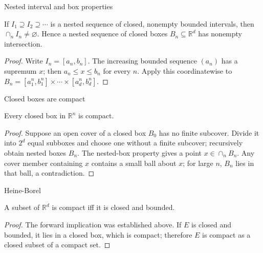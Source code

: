 \begin{theorem}{Nested interval and box properties}

If \(I_{1} \supseteq I_{2} \supseteq \cdots\) is a nested sequence of closed, nonempty bounded intervals, then \(\cap_{n}I_{n} \neq \varnothing\). Hence a nested sequence of closed boxes \(B_{n} \subseteq \mathbb{R}^{d}\) has nonempty intersection.

\end{theorem}

\begin{proof}

Write \(I_{n} = \left\lbrack {a_{n},b_{n}} \right\rbrack\). The increasing bounded sequence \(\left( a_{n} \right)\) has a supremum \(x\); then \(a_{n} \leq x \leq b_{n}\) for every \(n\). Apply this coordinatewise to \(B_{n} = \left\lbrack {a_{1}^{n},b_{1}^{n}} \right\rbrack \times \cdots \times \left\lbrack {a_{d}^{n},b_{d}^{n}} \right\rbrack\).

\end{proof}

\begin{theorem}{Closed boxes are compact}

Every closed box in \(\mathbb{R}^{n}\) is compact.

\end{theorem}

\begin{proof}

Suppose an open cover of a closed box \(B_{0}\) has no finite subcover. Divide it into \(2^{d}\) equal subboxes and choose one without a finite subcover; recursively obtain nested boxes \(B_{n}\). The nested-box property gives a point \(x \in \cap_{n}B_{n}\). Any cover member containing \(x\) contains a small ball about \(x\); for large \(n\), \(B_{n}\) lies in that ball, a contradiction.

\end{proof}

\begin{theorem}{Heine-Borel}

A subset of \(\mathbb{R}^{d}\) is compact iff it is closed and bounded.

\end{theorem}

\begin{proof}

The forward implication was established above. If \(E\) is closed and bounded, it lies in a closed box, which is compact; therefore \(E\) is compact as a closed subset of a compact set.

\end{proof}

